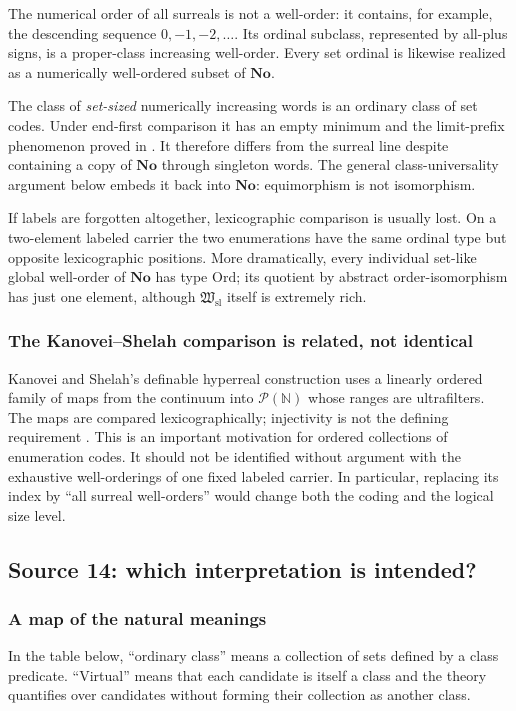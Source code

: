 \documentclass[11pt]{article}
\theoremstyle{definition}
\theoremstyle{remark}
\newcommand{\No}{\mathbf{No}}
\newcommand{\Ord}{\mathrm{Ord}}
\newcommand{\Hsl}{\mathfrak W_{\mathrm{sl}}}
\begin{document}
The numerical order of all surreals is not a well-order: it contains, for
example, the descending sequence $0,-1,-2,\ldots$. Its ordinal subclass,
represented by all-plus signs, is a proper-class increasing well-order.
Every set ordinal is likewise realized as a numerically well-ordered
subset of $\No$.

The class of \emph{set-sized} numerically increasing words is an ordinary
class of set codes. Under end-first comparison it has an empty minimum
and the limit-prefix phenomenon proved in .
It therefore differs from the surreal line despite containing a copy of
$\No$ through singleton words. The general class-universality argument
below embeds it back into $\No$: equimorphism is not isomorphism.

If labels are forgotten altogether, lexicographic comparison is usually
lost. On a two-element labeled carrier the two enumerations have the
same ordinal type but opposite lexicographic positions. More dramatically,
every individual set-like global well-order of $\No$ has type $\Ord$;
its quotient by abstract order-isomorphism has just one element, although
$\Hsl$ itself is extremely rich.

\subsubsection{The Kanovei--Shelah comparison is related, not identical}

Kanovei and Shelah's definable hyperreal construction uses a linearly
ordered family of maps from the continuum into $\mathcal P(\mathbb N)$
whose ranges are ultrafilters. The maps are compared lexicographically;
injectivity is not the defining requirement \cite{KanoveiShelah}.
This is an important motivation for ordered collections of enumeration
codes. It should not be identified without argument with the exhaustive
well-orderings of one fixed labeled carrier. In particular, replacing
its index by ``all surreal well-orders'' would change both the coding
and the logical size level.

\subsection{Source 14: which interpretation is intended?}
\label{swo:tc:sec:interpretations}
\subsubsection{A map of the natural meanings}
In the table below, ``ordinary class'' means a collection of sets defined
by a class predicate. ``Virtual'' means that each candidate is itself a
class and the theory quantifies over candidates without forming their
collection as another class.
\end{document}
